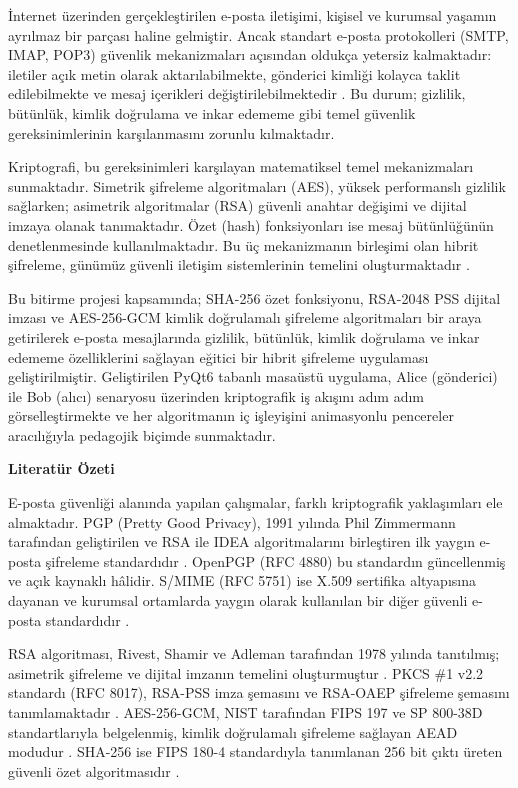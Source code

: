 \label{CH:Giris}

İnternet üzerinden gerçekleştirilen e-posta iletişimi, kişisel ve kurumsal yaşamın ayrılmaz bir parçası haline gelmiştir. Ancak standart e-posta protokolleri (SMTP, IMAP, POP3) güvenlik mekanizmaları açısından oldukça yetersiz kalmaktadır: iletiler açık metin olarak aktarılabilmekte, gönderici kimliği kolayca taklit edilebilmekte ve mesaj içerikleri değiştirilebilmektedir \cite{StallingsCNS}. Bu durum; gizlilik, bütünlük, kimlik doğrulama ve inkar edememe gibi temel güvenlik gereksinimlerinin karşılanmasını zorunlu kılmaktadır.

Kriptografi, bu gereksinimleri karşılayan matematiksel temel mekanizmaları sunmaktadır. Simetrik şifreleme algoritmaları (AES), yüksek performanslı gizlilik sağlarken; asimetrik algoritmalar (RSA) güvenli anahtar değişimi ve dijital imzaya olanak tanımaktadır. Özet (hash) fonksiyonları ise mesaj bütünlüğünün denetlenmesinde kullanılmaktadır. Bu üç mekanizmanın birleşimi olan hibrit şifreleme, günümüz güvenli iletişim sistemlerinin temelini oluşturmaktadır \cite{KatzLindell}.

Bu bitirme projesi kapsamında; SHA-256 özet fonksiyonu, RSA-2048 PSS dijital imzası ve AES-256-GCM kimlik doğrulamalı şifreleme algoritmaları bir araya getirilerek e-posta mesajlarında gizlilik, bütünlük, kimlik doğrulama ve inkar edememe özelliklerini sağlayan eğitici bir hibrit şifreleme uygulaması geliştirilmiştir. Geliştirilen PyQt6 tabanlı masaüstü uygulama, Alice (gönderici) ile Bob (alıcı) senaryosu üzerinden kriptografik iş akışını adım adım görselleştirmekte ve her algoritmanın iç işleyişini animasyonlu pencereler aracılığıyla pedagojik biçimde sunmaktadır.

\textbf{Literatür Özeti}

E-posta güvenliği alanında yapılan çalışmalar, farklı kriptografik yaklaşımları ele almaktadır. PGP (Pretty Good Privacy), 1991 yılında Phil Zimmermann tarafından geliştirilen ve RSA ile IDEA algoritmalarını birleştiren ilk yaygın e-posta şifreleme standardıdır \cite{ZimmermanPGP}. OpenPGP (RFC 4880) bu standardın güncellenmiş ve açık kaynaklı hâlidir. S/MIME (RFC 5751) ise X.509 sertifika altyapısına dayanan ve kurumsal ortamlarda yaygın olarak kullanılan bir diğer güvenli e-posta standardıdır \cite{RamsdellTurner}.

RSA algoritması, Rivest, Shamir ve Adleman tarafından 1978 yılında tanıtılmış; asimetrik şifreleme ve dijital imzanın temelini oluşturmuştur \cite{RSA1978}. PKCS \#1 v2.2 standardı (RFC 8017), RSA-PSS imza şemasını ve RSA-OAEP şifreleme şemasını tanımlamaktadır \cite{RFC8017}. AES-256-GCM, NIST tarafından FIPS 197 ve SP 800-38D standartlarıyla belgelenmiş, kimlik doğrulamalı şifreleme sağlayan AEAD modudur \cite{FIPS197, SP80038D}. SHA-256 ise FIPS 180-4 standardıyla tanımlanan 256 bit çıktı üreten güvenli özet algoritmasıdır \cite{FIPS1804}.

